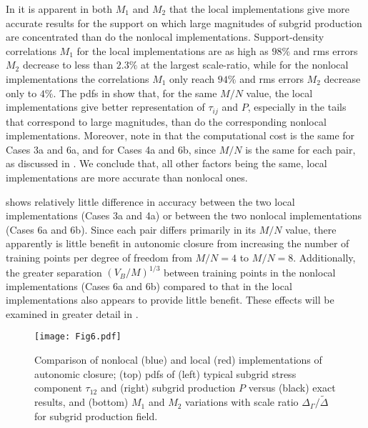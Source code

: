 In  it is apparent in both $M_1$  and $M_2$  that the local implementations give more accurate results for the support on which large magnitudes of subgrid production are concentrated than do the nonlocal implementations. Support-density correlations $M_1$ for the local implementations are as high as $98\%$ and rms errors $M_2$  decrease to less than $2.3\%$  at the largest scale-ratio, while for the nonlocal implementations the correlations $M_1$  only reach $94\%$ and rms errors $M_2$  decrease only to $4\%$. The pdfs in   show that, for the same $M/N$  value, the local implementations give better representation of  $\tau_{ij}$ and $P$, especially in the tails that correspond to large magnitudes, than do the corresponding nonlocal implementations. Moreover, note in  that the computational cost is the same for Cases 3a and 6a, and for Cases 4a and 6b, since  $M/N$ is the same for each pair, as discussed in . We conclude that, all other factors being the same, local implementations are more accurate than nonlocal ones. 

 shows relatively little difference in accuracy between the two local implementations (Cases 3a and 4a) or between the two nonlocal implementations (Cases 6a and 6b). Since each pair differs primarily in its  $M/N$ value, there apparently is little benefit in autonomic closure from increasing the number of training points per degree of freedom from  $M/N = 4$ to  $M/N = 8$. Additionally, the greater separation  $(V_B/M)^{1/3}$ between training points in the nonlocal implementations (Cases 6a and 6b) compared to that in the local implementations also appears to provide little benefit. These effects will be examined in greater detail in .

%
\begin{figure}
	\begin{center}
	\texttt{[image: Fig6.pdf]}
	\caption{ Comparison of nonlocal (blue) and local (red) implementations of autonomic closure; (top) pdfs of (left) typical subgrid stress component $\tau_{12}$ and (right) subgrid production $P$ versus (black) exact results, and (bottom) $M_1$ and $M_2$ variations with scale ratio $\Delta_{\Gamma}/\widetilde{\Delta}$ for subgrid production field. }
	\label{F:6}
	\end{center}
\end{figure}
%
%

